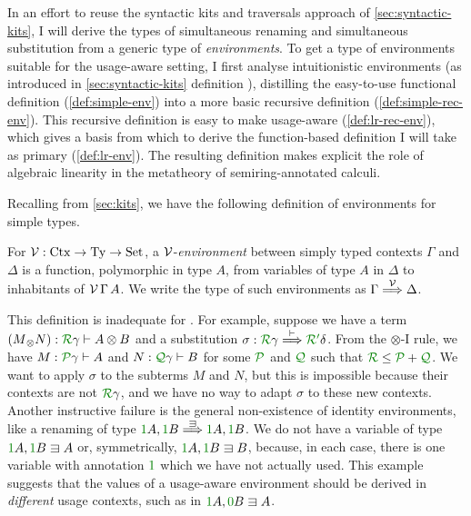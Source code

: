 In an effort to reuse the syntactic kits and traversals approach of
\cref{sec:syntactic-kits}, I will derive the types of simultaneous renaming
and simultaneous substitution from a generic type of \emph{environments}.
To get a type of environments suitable for the usage-aware setting, I first
analyse intuitionistic environments (as introduced in \cref{sec:syntactic-kits}
definition ), distilling the easy-to-use functional definition
(\cref{def:simple-env}) into a more basic recursive definition
(\cref{def:simple-rec-env}).
This recursive definition is easy to make usage-aware (\cref{def:lr-rec-env}),
which gives a basis from which to derive the function-based definition I will
take as primary (\cref{def:lr-env}).
The resulting definition makes explicit the role of algebraic linearity in the
metatheory of semiring-annotated calculi.

Recalling from \cref{sec:kits}, we have the following definition of
environments for simple types.

\begin{definition}\label{def:simple-env}
  For $\mathcal V : \mathrm{Ctx} \to \mathrm{Ty} \to \mathrm{Set}$,
  a $\mathcal V$-\emph{environment} between simply typed contexts $\Gamma$ and $\Delta$
  is a function, polymorphic in type $A$, from variables of type $A$ in
  $\Delta$ to inhabitants of $\mathcal V\,\Gamma\,A$.
  We write the type of such environments as $\Gamma \stackrel{\mathcal V}\Longrightarrow \Delta$.
\end{definition}

This definition is inadequate for \name{}.
For example, suppose we have a term
$\plr{M{_\otimes}N} : \grR\gamma \vdash A \otimes B$ and a substitution
$\sigma : \grR\gamma \env\vdash \grR\gr'\delta$.
From the $\otimes$-I rule, we have $M : \grP\gamma \vdash A$ and
$N : \grQ\gamma \vdash B$ for some $\grP$ and $\grQ$ such that
$\grR \leq \grP + \grQ$.
We want to apply $\sigma$ to the subterms $M$ and $N$, but this is impossible
because their contexts are not $\grR\gamma$, and we have no way to adapt
$\sigma$ to these new contexts.
Another instructive failure is the general non-existence of identity
environments, like a renaming of type $\gr1A, \gr1B \env\sqni \gr1A, \gr1B$.
We do not have a variable of type $\gr1A, \gr1B \sqni A$ or, symmetrically,
$\gr1A, \gr1B \sqni B$, because, in each case, there is one variable with
annotation $\gr1$ which we have not actually used.
This example suggests that the values of a usage-aware environment should be
derived in \emph{different} usage contexts, such as in $\gr1A, \gr0B \sqni A$.

